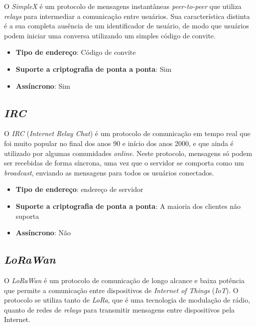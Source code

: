 O \textit{SimpleX} é um protocolo de mensagens instantâneas \textit{peer-to-peer} que utiliza \textit{relays} para intermediar a comunicação entre usuários. Sua característica distinta é a sua completa ausência de um identificador de usuário, de modo que usuários podem iniciar uma conversa utilizando um simples código de convite. \cite{simplex}

\begin{itemize}
  \item \textbf{Tipo de endereço}: Código de convite
  \item \textbf{Suporte a criptografia de ponta a ponta}: Sim
  \item \textbf{Assíncrono}: Sim
\end{itemize}

\subsection{\textit{IRC}}

O \textit{IRC} (\textit{Internet Relay Chat}) é um protocolo de comunicação em tempo real que foi muito popular no final dos anos 90 e início dos anos 2000, e que ainda é utilizado por algumas comunidades \textit{online}. Neste protocolo, mensagens só podem ser recebidas de forma síncrona, uma vez que o servidor se comporta como um \textit{broadcast}, enviando as mensagens para todos os usuários conectados. \cite{rfc2810}

\begin{itemize}
  \item \textbf{Tipo de endereço}: endereço de servidor
  \item \textbf{Suporte a criptografia de ponta a ponta}: A maioria dos clientes não suporta
  \item \textbf{Assíncrono}: Não
\end{itemize}

\subsection{\textit{LoRaWan}}

O \textit{LoRaWan} é um protocolo de comunicação de longo alcance e baixa potência que permite a comunicação entre dispositivos de \textit{Internet of Things} (\textit{IoT}). O protocolo se utiliza tanto de \textit{LoRa}, que é uma tecnologia de modulação de rádio, quanto de redes de \textit{relays} para transmitir mensagens entre dispositivos pela Internet. \cite{lorawan}

